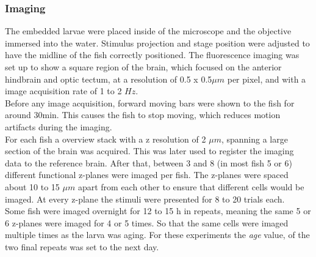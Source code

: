 \documentclass[12pt, a4paper, oneside]{article}
\begin{document}
\subsubsection{Imaging}
The embedded larvae were placed inside of the microscope and the objective immersed into the water. Stimulus projection and stage position were adjusted to have the midline of the fish correctly positioned. The fluorescence imaging was set up to show a square region of the brain, which focused on the anterior hindbrain and optic tectum, at a resolution of 0.5 x 0.5$\mu m$ per pixel, and with a image acquisition rate of 1 to 2 $Hz$.\\
Before any image acquisition, forward moving bars were shown to the fish for around 30min. This causes the fish to stop moving, which reduces motion artifacts during the imaging.\\
For each fish a overview stack with a z resolution of 2 $\mu m$, spanning a large section of the brain was acquired. This was later used to register the imaging data to the reference brain.
After that, between 3 and 8 (in most fish 5 or 6) different functional z-planes were imaged per fish. The z-planes were spaced about 10 to 15 $\mu m$ apart from each other to ensure that different cells would be imaged. At every z-plane the stimuli were presented for 8 to 20 trials each.\\
Some fish were imaged overnight for 12 to 15  h in repeats, meaning the same 5 or 6 z-planes were imaged for 4 or 5 times. So that the same cells were imaged multiple times as the larva was aging. For these experiments the \textit{age} value, of the two final repeats was set to the next day.\\
\end{document}
